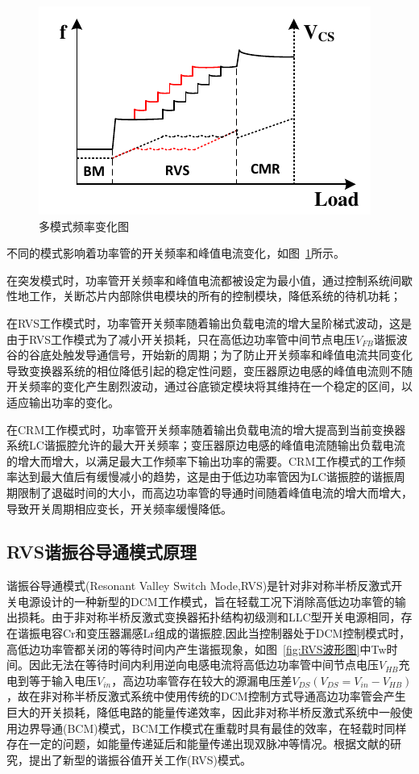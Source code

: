 \begin{figure}[htbp] 
    \centering
    \includegraphics[width=0.8\linewidth]{figures/模式切换2.pdf}
    \caption{多模式频率变化图}
    \label{fig:模式切换2}
\end{figure}

不同的模式影响着功率管的开关频率和峰值电流变化，如图~\ref{fig:模式切换2}所示。

在突发模式时，功率管开关频率和峰值电流都被设定为最小值，通过控制系统间歇性地工作，关断芯片内部除供电模块的所有的控制模块，降低系统的待机功耗；

在RVS工作模式时，功率管开关频率随着输出负载电流的增大呈阶梯式波动，这是由于RVS工作模式为了减小开关损耗，只在高低边功率管中间节点电压$V_{FB}$谐振波谷的谷底处触发导通信号，开始新的周期；为了防止开关频率和峰值电流共同变化导致变换器系统的相位降低引起的稳定性问题，变压器原边电感的峰值电流则不随开关频率的变化产生剧烈波动，通过谷底锁定模块将其维持在一个稳定的区间，以适应输出功率的变化。

在CRM工作模式时，功率管开关频率随着输出负载电流的增大提高到当前变换器系统LC谐振腔允许的最大开关频率；变压器原边电感的峰值电流随输出负载电流的增大而增大，以满足最大工作频率下输出功率的需要。CRM工作模式的工作频率达到最大值后有缓慢减小的趋势，这是由于低边功率管因为LC谐振腔的谐振周期限制了退磁时间的大小，而高边功率管的导通时间随着峰值电流的增大而增大，导致开关周期相应变长，开关频率缓慢降低。


\subsection{RVS谐振谷导通模式原理}



谐振谷导通模式(Resonant Valley Switch Mode,RVS)是针对非对称半桥反激式开关电源设计的一种新型的DCM工作模式，旨在轻载工况下消除高低边功率管的输出损耗。由于非对称半桥反激式变换器拓扑结构初级测和LLC型开关电源相同，存在谐振电容Cr和变压器漏感Lr组成的谐振腔,因此当控制器处于DCM控制模式时，高低边功率管都关闭的等待时间内产生谐振现象，如图~\ref{fig:RVS波形图}中Tw时间。因此无法在等待时间内利用逆向电感电流将高低边功率管中间节点电压$V_{HB}$充电到等于输入电压$V_{in}$，高边功率管存在较大的源漏电压差$V_{DS}(V_{DS}=V_{in}-V_{HB})$，故在非对称半桥反激式系统中使用传统的DCM控制方式导通高边功率管会产生巨大的开关损耗，降低电路的能量传递效率，因此非对称半桥反激式系统中一般使用边界导通(BCM)模式，BCM工作模式在重载时具有最佳的效率，在轻载时同样存在一定的问题，如能量传递延后和能量传递出现双脉冲等情况。根据文献的研究，提出了新型的谐振谷值开关工作(RVS)模式。

